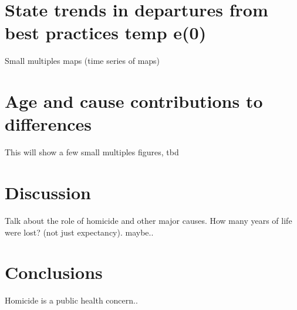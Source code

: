 \documentclass{article}
\begin{document}
\section{State trends in departures from best practices temp e(0)}
Small multiples maps (time series of maps)

\section{Age and cause contributions to differences}

This will show a few small multiples figures, tbd 

\section{Discussion}
Talk about the role of homicide and other major causes. How many years of life
were lost? (not just expectancy). maybe..

\section{Conclusions}
Homicide is a public health concern..
\end{document}
